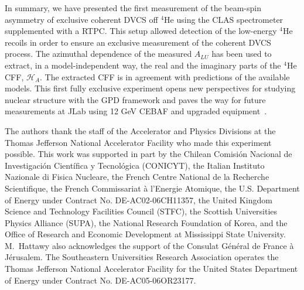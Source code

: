 \documentclass[twocolumn,nofootinbib,prl,superscriptaddress,secnumarabic,amssymb,nobibnotes,aps,floatfix]{revtex4}
\begin{document}
In summary, we have presented the first measurement of the beam-spin asymmetry
of exclusive coherent DVCS off $^4$He using the CLAS spectrometer supplemented 
with a RTPC. This setup allowed detection of the 
low-energy $^4$He recoils in order to ensure an exclusive measurement of the
coherent DVCS process. The azimuthal dependence of the measured $A_{LU}$ has 
been used to extract, in a model-independent way, the real and the imaginary 
parts of the $^4$He CFF, $\mathcal{H}_A$. The extracted CFF is in  
agreement with predictions of the available models. This first fully exclusive 
experiment opens new perspectives for studying nuclear structure with the GPD 
framework and paves the way for future measurements at JLab using 12 GeV CEBAF 
and upgraded equipment~\cite{Armstrong:2017wfw}.

The authors thank the staff of the Accelerator and Physics Divisions at the 
Thomas Jefferson National Accelerator Facility who made this experiment 
possible. This work was supported in part by the Chilean Comisi\'on Nacional 
de Investigaci\'on Cient\'ifica y Tecnol\'ogica (CONICYT), the Italian 
Instituto Nazionale di Fisica Nucleare, the French Centre National de la 
Recherche Scientifique, the French Commissariat \`a l'Energie Atomique, the 
U.S. Department of Energy under Contract No. DE-AC02-06CH11357, the United 
Kingdom Science and Technology Facilities Council (STFC), the Scottish 
Universities Physics Alliance (SUPA), the National Research Foundation of 
Korea, and the Office of Research and Economic Development at Mississippi State 
University. M.~Hattawy also acknowledges the support of the Consulat 
G\'en\'eral de France \`a J\'erusalem.  The Southeastern Universities Research 
Association operates the Thomas Jefferson National Accelerator Facility for the 
United States Department of Energy under Contract No. DE-AC05-06OR23177.
\end{document}
